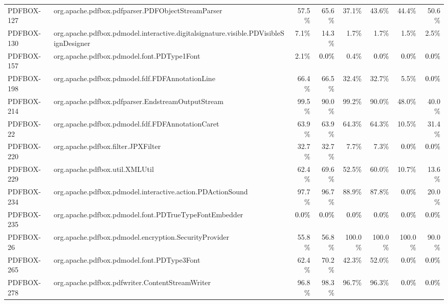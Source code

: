 \begin{tabular}{ ll rr rr rr}
PDFBOX-127  &  org.apache.pdfbox.pdfparser.PDFObjectStreamParser & 57.5\% & 65.6\% & 37.1\% & 43.6\% & 44.4\% & 50.6\%\\ 
PDFBOX-130  &  org.apache.pdfbox.pdmodel.interactive.digitalsignature.visible.PDVisibleSignDesigner & 7.1\% & 14.3\% & 1.7\% & 1.7\% & 1.5\% & 2.5\%\\ 
PDFBOX-157  &  org.apache.pdfbox.pdmodel.font.PDType1Font & 2.1\% & \cellcolor{light-gray} \textcolor{black}{0.0\%} & 0.4\% & \cellcolor{light-gray} \textcolor{black}{0.0\%} & \cellcolor{light-gray} \textcolor{black}{0.0\%} & \cellcolor{light-gray} \textcolor{black}{0.0\%}\\ 
PDFBOX-198  &  org.apache.pdfbox.pdmodel.fdf.FDFAnnotationLine & 66.4\% & 66.5\% & 32.4\% & 32.7\% & 5.5\% & \cellcolor{light-gray} \textcolor{black}{0.0\%}\\ 
PDFBOX-214  &  org.apache.pdfbox.pdfparser.EndstreamOutputStream & 99.5\% & 90.0\% & 99.2\% & 90.0\% & 48.0\% & 40.0\%\\ 
PDFBOX-22  &  org.apache.pdfbox.pdmodel.fdf.FDFAnnotationCaret & 63.9\% & 63.9\% & 64.3\% & 64.3\% & 10.5\% & 31.4\%\\ 
PDFBOX-220  &  org.apache.pdfbox.filter.JPXFilter & 32.7\% & 32.7\% & 7.7\% & 7.3\% & \cellcolor{light-gray} \textcolor{black}{0.0\%} & \cellcolor{light-gray} \textcolor{black}{0.0\%}\\ 
PDFBOX-229  &  org.apache.pdfbox.util.XMLUtil & 62.4\% & 69.6\% & 52.5\% & 60.0\% & 10.7\% & 13.6\%\\ 
PDFBOX-234  &  org.apache.pdfbox.pdmodel.interactive.action.PDActionSound & 97.7\% & 96.7\% & 88.9\% & 87.8\% & \cellcolor{light-gray} \textcolor{black}{0.0\%} & 20.0\%\\ 
PDFBOX-235  &  org.apache.pdfbox.pdmodel.font.PDTrueTypeFontEmbedder & \cellcolor{light-gray} \textcolor{black}{0.0\%} & \cellcolor{light-gray} \textcolor{black}{0.0\%} & \cellcolor{light-gray} \textcolor{black}{0.0\%} & \cellcolor{light-gray} \textcolor{black}{0.0\%} & \cellcolor{light-gray} \textcolor{black}{0.0\%} & \cellcolor{light-gray} \textcolor{black}{0.0\%}\\ 
PDFBOX-26  &  org.apache.pdfbox.pdmodel.encryption.SecurityProvider & 55.8\% & 56.8\% & 100.0\% & 100.0\% & 100.0\% & 90.0\%\\ 
PDFBOX-265  &  org.apache.pdfbox.pdmodel.font.PDType3Font & 62.4\% & 70.2\% & 42.3\% & 52.0\% & \cellcolor{light-gray} \textcolor{black}{0.0\%} & \cellcolor{light-gray} \textcolor{black}{0.0\%}\\ 
PDFBOX-278  &  org.apache.pdfbox.pdfwriter.ContentStreamWriter & 96.8\% & 98.3\% & 96.7\% & 96.3\% & \cellcolor{light-gray} \textcolor{black}{0.0\%} & \cellcolor{light-gray} \textcolor{black}{0.0\%}\\ 

\end{tabular}

